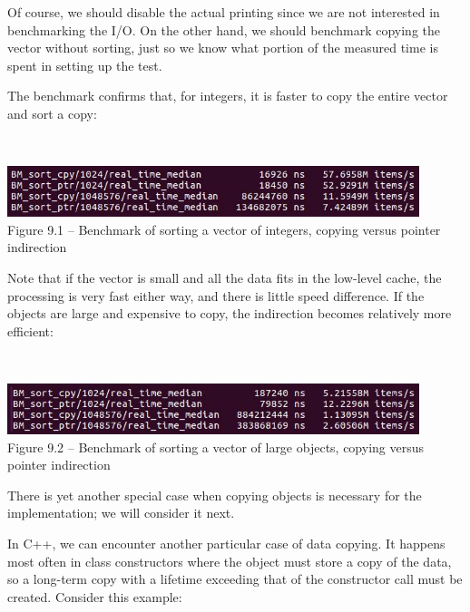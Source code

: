 Of course, we should disable the actual printing since we are not interested in benchmarking the I/O. On the other hand, we should benchmark copying the vector without sorting, just so we know what portion of the measured time is spent in setting up the test.

The benchmark confirms that, for integers, it is faster to copy the entire vector and sort a copy:

\hspace*{\fill} \\ %
\begin{center}
\includegraphics[width=0.9\textwidth]{content/3/chapter9/images/1.jpg}\\
Figure 9.1 – Benchmark of sorting a vector of integers, copying versus pointer indirection
\end{center}

Note that if the vector is small and all the data fits in the low-level cache, the processing is very fast either way, and there is little speed difference. If the objects are large and expensive to copy, the indirection becomes relatively more efficient:

\hspace*{\fill} \\ %
\begin{center}
\includegraphics[width=0.9\textwidth]{content/3/chapter9/images/2.jpg}\\
Figure 9.2 – Benchmark of sorting a vector of large objects, copying versus pointer indirection
\end{center}

There is yet another special case when copying objects is necessary for the implementation; we will consider it next.


In C++, we can encounter another particular case of data copying. It happens most often in class constructors where the object must store a copy of the data, so a long-term copy with a lifetime exceeding that of the constructor call must be created. Consider this example:


